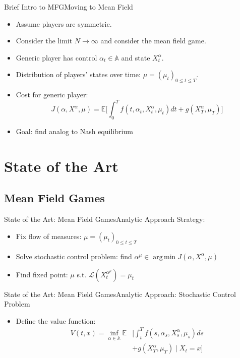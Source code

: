 \documentclass{beamer}
\DeclareMathOperator*{\argmin}{arg\,min}
\begin{document}
	\begin{frame}{Brief Intro to MFG}{Moving to Mean Field}
		\begin{itemize}
			\item {
				Assume players are symmetric.
			}
			\item {
				Consider the limit $N \rightarrow \infty$ and consider the mean field game.
		    }
			\item {
				Generic player has control $\alpha_t \in \mathbb{A}$ and state $X_t^{\alpha}$.
			}
			\item {
				Distribution of players' states over time: $\mu=(\mu_t)_{0 \leq t \leq T}$.
			}
			\item {
				Cost for generic player:
				\begin{equation}
				J(\alpha,X^{\alpha},\mu)=\mathbb{E}\Bigg[\int_{0}^{T}f(t,\alpha_t,X_t^{\alpha},\mu_t)dt+g(X_T^{\alpha},\mu_T) \Bigg]
				\end{equation}
			}
			\pause
			\item {
				Goal: find analog to Nash equilibrium
			}
		\end{itemize}
	\end{frame}

\section{State of the Art}

\subsection{Mean Field Games}

\begin{frame}{State of the Art: Mean Field Games}{Analytic Approach}
	Strategy:
	\begin{itemize}
				\item {
					Fix flow of measures: $\mu=(\mu_t)_{0 \leq t \leq T}$
				}
				\item {
					Solve stochastic control problem: find $\alpha^{\mu} \in \argmin J(\alpha,X^{\alpha},\mu)$
				}
				\item {
					Find fixed point: $\mu$ s.t. $\mathcal{L}(X_t^{\alpha^{\mu}})=\mu_t$
				}
	\end{itemize}
\end{frame}
		
\begin{frame}{State of the Art: Mean Field Games}{Analytic Approach: Stochastic Control Problem}
	\begin{itemize}
				\item {
					Define the value function:
					\begin{equation}
					\begin{split}
					V(t,x)=\inf_{\alpha \in \mathbb{A}}\mathbb{E}&\Bigg[\int_{t}^{T}f(s,\alpha_s,X_s^{\alpha},\mu_s)ds \\
					&+g(X_T^{\alpha},\mu_T) \mid X_t = x \Bigg]
					\end{split}
					\end{equation}
				}
			\end{itemize}
\end{frame}
		
\end{document}
